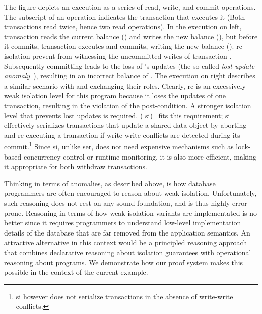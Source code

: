 The figure depicts an execution as a series of read, write, and commit
operations. The subscript of an operation indicates the transaction
that executes it (Both transactions read  twice, hence two read
operations). In the execution on left, transaction  reads the
current balance () and writes the new balance (), but
before it commits, transaction  executes and commits, writing
the new balance (). {\sc rc} isolation prevent  from
witnessing the uncommitted writes of transaction .
Subsequently committing  leads to the loss of 's updates
(the so-called \emph{lost update anomaly}~\cite{berenson}), resulting
in an incorrect balance of . The execution on right describes
a similar scenario with  and  exchanging their roles.
Clearly, {\sc rc} is an excessively weak isolation level for this
program because it loses the updates of one transaction, resulting in
the violation of the post-condition.  A stronger isolation level that
prevents lost updates is required.  ({\sc
si})~\cite{berenson} fits this requirement; {\sc si} effectively
serializes transactions that update a shared data object by aborting
and re-executing a transaction if write-write conflicts are detected
during its commit.\footnote{{\sc si} however does not serialize
transactions in the absence of write-write conflicts.} Since {\sc si},
unlike {\sc ser}, does not need expensive mechanisms such as
lock-based concurrency control or runtime monitoring, it is also more
efficient, making it appropriate for both withdraw transactions.

Thinking in terms of anomalies, as described above, is how database
programmers are often encouraged to reason about weak isolation.
Unfortunately, such reasoning does not rest on any sound foundation,
and is thus highly error-prone. Reasoning in terms of how weak
isolation variants are implementated is no better since it requires
programmers to understand low-level implementation details of the
database that are far removed from the application semantics. An
attractive  alternative in this context would be a principled
reasoning approach that combines declarative reasoning about isolation
guarantees with operational reasoning about programs. We demonstrate
how our proof system makes this possible in the context of the current
example.

